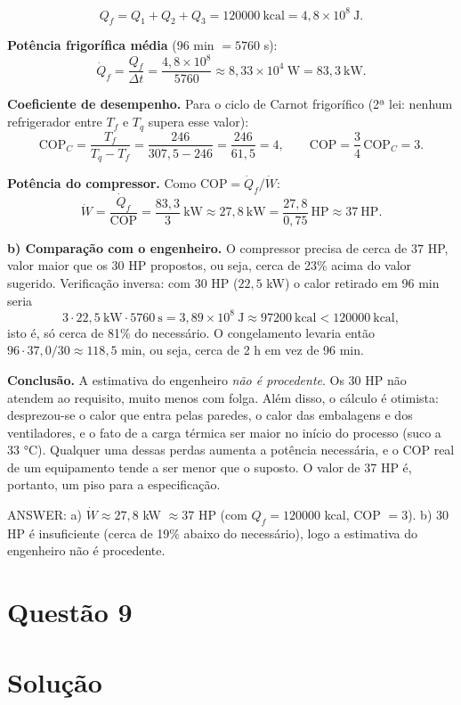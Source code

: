 \documentclass{article}%
\begin{document}
\[
Q_f = Q_1+Q_2+Q_3 = 120000\ \text{kcal} = 4{,}8\times 10^{8}\ \text{J}.
\]

\textbf{Potência frigorífica média} (96 min $=5760$ s):
\[
\dot Q_f=\frac{Q_f}{\Delta t}=\frac{4{,}8\times 10^{8}}{5760}\approx 8{,}33\times 10^{4}\ \text{W}=83{,}3\ \text{kW}.
\]

\textbf{Coeficiente de desempenho.} Para o ciclo de Carnot frigorífico (2ª lei: nenhum refrigerador entre $T_f$ e $T_q$ supera esse valor):
\[
\text{COP}_{C}=\frac{T_f}{T_q-T_f}=\frac{246}{307{,}5-246}=\frac{246}{61{,}5}=4,
\qquad
\text{COP}=\frac34\,\text{COP}_C=3 .
\]

\textbf{Potência do compressor.} Como $\text{COP}=\dot Q_f/\dot W$:
\[
\dot W=\frac{\dot Q_f}{\text{COP}}=\frac{83{,}3}{3}\ \text{kW}\approx 27{,}8\ \text{kW}
=\frac{27{,}8}{0{,}75}\ \text{HP}\approx 37\ \text{HP}.
\]

\textbf{b) Comparação com o engenheiro.} O compressor precisa de cerca de $37$ HP, valor maior que os 30 HP propostos, ou seja, cerca de 23\% acima do valor sugerido. Verificação inversa: com 30 HP ($22{,}5$ kW) o calor retirado em 96 min seria
\[
3\cdot 22{,}5\ \text{kW}\cdot 5760\ \text{s}=3{,}89\times 10^{8}\ \text{J}\approx 97200\ \text{kcal}<120000\ \text{kcal},
\]
isto é, só cerca de 81\% do necessário. O congelamento levaria então
$96\cdot 37{,}0/30\approx 118{,}5$ min, ou seja, cerca de 2 h em vez de 96 min.

\textbf{Conclusão.} A estimativa do engenheiro \emph{não é procedente}. Os 30 HP não atendem ao requisito, muito menos com folga. Além disso, o cálculo é otimista: desprezou-se o calor que entra pelas paredes, o calor das embalagens e dos ventiladores, e o fato de a carga térmica ser maior no início do processo (suco a 33 °C). Qualquer uma dessas perdas aumenta a potência necessária, e o COP real de um equipamento tende a ser menor que o suposto. O valor de 37 HP é, portanto, um piso para a especificação.

ANSWER: a) $\dot W\approx 27{,}8$ kW $\approx 37$ HP (com $Q_f=120000$ kcal, COP $=3$). b) 30 HP é insuficiente (cerca de 19\% abaixo do necessário), logo a estimativa do engenheiro não é procedente.%
\newpage%
\section*{Questão 9}

\section*{Solução}
\end{document}
